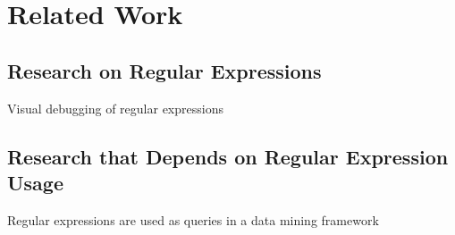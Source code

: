 \section{Related Work}

\subsection{Research on Regular Expressions}
Visual debugging of regular expressions~\cite{Beck:2014:RVD:2591062.2591111}

\subsection{Research that Depends on Regular Expression Usage}
Regular expressions are used as queries in a data mining framework~\cite{Begel:2010:CDE:1806799.1806821}
